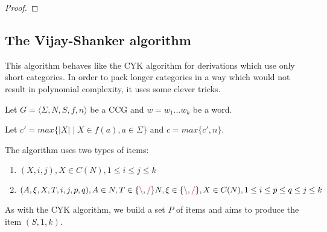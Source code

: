 \documentclass[main.tex]{subfiles}
\begin{document}
\begin{proof}
\end{proof}

\subsection{The Vijay-Shanker algorithm}

This algorithm behaves like the CYK algorithm for derivations which use only
short categories. In order to pack longer categories in a way which would not
result in polynomial complexity, it uses some clever tricks.

Let $ G = \langle \Sigma, N, S, f, n \rangle $ be a CCG and $w = w_1 ... w_k$
be a word.

Let $c' = max \{ |X| \mid X \in f(a), a \in \Sigma \}$ and $c = max \{ c', n \}$.

The algorithm uses two types of items:
\begin{enumerate}
    \item $(X, i, j), X \in C(N), 1 \leq i \leq j \leq k$
    \item $(A, \xi, X, T, i, j, p, q), A \in N, T \in \{ \textcolor{red}{\backslash}, \textcolor{red}{/} \} N, \xi \in \{ \textcolor{red}{\backslash}, \textcolor{red}{/} \}, X \in C(N), 1 \leq i \leq p \leq q \leq j \leq k$
\end{enumerate}

As with the CYK algorithm, we build a set ${P}$ of items and aims to produce the item
$(S, 1, k)$.
\end{document}
